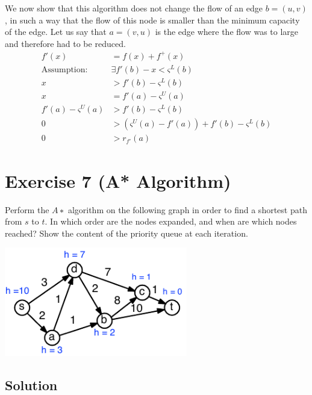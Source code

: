 \documentclass[a4paper, 12pt]{report}
\begin{document}
\begin{leftbar}
    
\end{leftbar}

We now show that this algorithm does not change the flow of an edge $b=(u,v)$,
in such a way that the flow of this node is smaller than the minimum capacity
of the edge. Let us say that $a=(v,u)$ is the edge where the flow was to large
and therefore had to be reduced.
\begin{align*}
    f'(x) &= f(x) + f^+(x)\\[10pt]
    \text{Assumption: } &∃ f'(b) - x < ς^L(b)\\[10pt]
    x &> f'(b) - ς^L(b)\\
    x &= f'(a) - ς^U(a)\\
    f'(a) - ς^U(a) &> f'(b) - ς^L(b)\\
    0 &> (ς^U(a) - f'(a)) + f'(b) - ς^L(b)\\
    0 &> r_{f'}(a)
\end{align*}

\section{Exercise 7 (A* Algorithm)}

Perform the $A∗$ algorithm on the following graph in order to find a shortest
path from $s$ to $t$. In which order are the nodes expanded, and when are which
nodes reached? Show the content of the priority queue at each iteration.

\begin{center}
    \includegraphics[width=0.6\textwidth]{Figures/Exercise_2_7}
\end{center}

\subsection{Solution}
\end{document}

